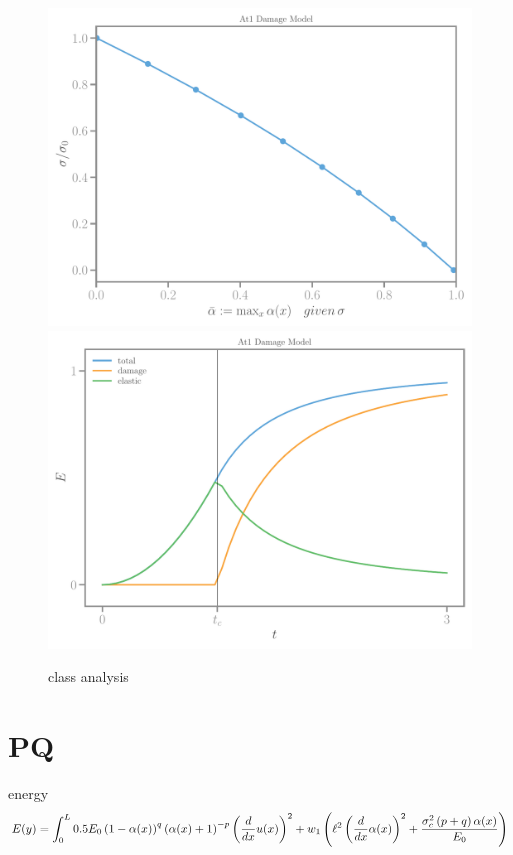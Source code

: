 \documentclass[]{article}
\begin{document}
\begin{figure}[htbp]
  \includegraphics[width=.33\textheight]{../figures/at1-maxalpha.pdf}
  \includegraphics[width=.33\textheight]{../figures/at1-energies-homog.pdf}
  \caption{class analysis}
  \label{fig:class-analyser}
\end{figure}

\section*{PQ}

energy
\begin{equation}
  \label{eqn:mod-energy}
E(y)  =  \int_0^L
0.5 E_{0} \left(1 - \alpha{\left(x \right)}\right)^{q} \left(\alpha{\left(x \right)} + 1\right)^{- p} \left(\frac{d}{d x} u{\left(x \right)}\right)^{2} + w_{1} \left(\ell^{2} \left(\frac{d}{d x} \alpha{\left(x \right)}\right)^{2} + \frac{\sigma_c^{2} \left(p + q\right) \alpha{\left(x \right)}}{E_{0}}\right)\end{equation}
\end{document}

